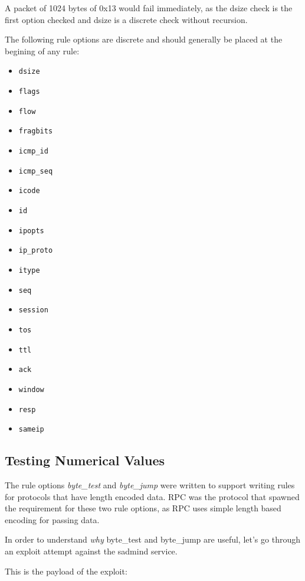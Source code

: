 \documentclass[english]{report}
\begin{document}
A packet of 1024 bytes of 0x13 would fail immediately, as the dsize check is
the first option checked and dsize is a discrete check without recursion.

The following rule options are discrete and should generally be placed at the
begining of any rule:

\begin{itemize}
\item \texttt{dsize}
\item \texttt{flags}
\item \texttt{flow}
\item \texttt{fragbits}
\item \texttt{icmp\_id}
\item \texttt{icmp\_seq} 
\item \texttt{icode} 
\item \texttt{id}
\item \texttt{ipopts}
\item \texttt{ip\_proto} 
\item \texttt{itype} 
\item \texttt{seq}
\item \texttt{session} 
\item \texttt{tos}
\item \texttt{ttl}
\item \texttt{ack}
\item \texttt{window}
\item \texttt{resp} 
\item \texttt{sameip}
\end{itemize}

\subsection{Testing Numerical Values \label{testing numerical values}}
The rule options \emph{byte\_test} and \emph{byte\_jump} were written to
support writing rules for protocols that have length encoded data.  RPC was the 
protocol that spawned the requirement for these two rule options, as RPC uses simple 
length based encoding for passing data.

In order to understand \emph{why} byte\_test and byte\_jump are useful, let's go
through an exploit attempt against the sadmind service.

This is the payload of the exploit:
\end{document}
